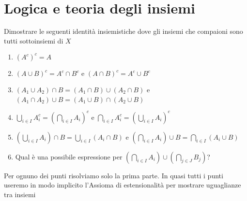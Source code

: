 \documentclass[a4paper]{article}\par \usepackage{style}\par
\begin{document}
\section{Logica e teoria degli insiemi}
\begin{es}
  Dimostrare le seguenti identità insiemistiche dove gli insiemi che compaioni sono tutti sottoinsiemi di $ X $
  \begin{enumerate}
  \item $ (A^c)^c = A $
  \item $ (A \cup B)^c = A^c \cap B^c $ e $ (A \cap B)^c = A^c \cup B^c $
  \item $ (A_1 \cup A_2) \cap B = (A_1 \cap B) \cup (A_2 \cap B) $ e $ (A_1 \cap A_2) \cup B = (A_1 \cup B) \cap (A_2 \cup B) $
  \item $ \bigcup_{i \in I} A_i ^c = \left (\bigcap_{i \in I} A_i \right )^c $ e $ \bigcap_{i \in I} A_i ^c = \left (\bigcup_{i \in I} A_i \right )^c $
  \item $ \left (\bigcup_{i \in I} A_i \right ) \cap B = \bigcup_{i \in I} (A_i \cap B) $ e $ \left (\bigcap_{i \in I} A_i \right ) \cup B = \bigcap_{i \in I} (A_i \cup B) $
  \item Qual è una possibile espressione per $ \left (\bigcap_{i \in I} A_i \right ) \cup \left (\bigcap_{j \in J} B_j \right ) $?
  \end{enumerate}
\end{es}
Per ognuno dei punti risolviamo solo  la prima parte. In quasi tutti i punti useremo in modo implicito l'Assioma di estensionalità per mostrare uguaglianze tra insiemi
\end{document}
